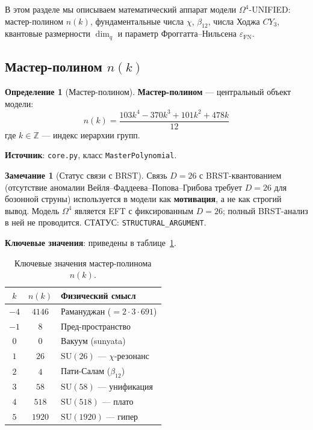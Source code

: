\documentclass[11pt,a4paper]{article}
\newcommand{\SU}{\ensuremath{\mathrm{SU}}}
\newcommand{\CY}{\ensuremath{CY_3}}
\newcommand{\Om}{\ensuremath{\Omega^4}}
\newcommand{\epsFN}{\ensuremath{\varepsilon_{\text{FN}}}}
\theoremstyle{definition}
\newtheorem{definition}[theorem]{Определение}
\newtheorem{remark}[theorem]{Замечание}
\begin{document}
В этом разделе мы описываем математический аппарат модели $\Om$-UNIFIED:
мастер-полином $n(k)$, фундаментальные числа $\chi$, $\beta_{12}$,
числа Ходжа $\CY$, квантовые размерности $\dim_q$ и параметр
Фроггатта--Нильсена $\epsFN$.

\subsection{Мастер-полином \texorpdfstring{$n(k)$}{n(k)}}
\label{subsec:master-poly}

\begin{definition}[Мастер-полином]
\label{def:master-poly}
\textbf{Мастер-полином} --- центральный объект модели:
\begin{equation}
    \boxed{
    n(k) = \frac{103 k^4 - 370 k^3 + 101 k^2 + 478 k}{12}
    }
    \label{eq:master-poly}
\end{equation}
где $k \in \mathbb{Z}$ --- индекс иерархии групп.
\end{definition}

\textbf{Источник}: \texttt{core.py}, класс \texttt{MasterPolynomial}.

\begin{remark}[Статус связи с BRST]
\label{rem:brst-status}
Связь $D = 26$ с BRST-квантованием
(отсутствие аномалии Вейля–Фаддеева–Попова–Грибова
требует $D = 26$ для бозонной струны)
используется в модели как \textbf{мотивация}, а не как
строгий вывод. Модель $\Om$ является EFT с фиксированным
$D = 26$; полный BRST-анализ в ней не проводится.
СТАТУС: \texttt{STRUCTURAL\_ARGUMENT}.
\end{remark}

\medskip\noindent
\textbf{Ключевые значения}: приведены в таблице~\ref{tab:master-poly-values}.

\begin{table}[ht]
\centering
\caption{Ключевые значения мастер-полинома \texorpdfstring{$n(k)$}{n(k)}.}
\label{tab:master-poly-values}
\begin{tabular}{ccl}
\toprule
$k$ & $n(k)$ & Физический смысл \\
\midrule
$-4$ & $4146$ & Рамануджан ($= 2 \cdot 3 \cdot 691$) \\
$-1$ & $8$ & Пред-пространство \\
$0$ & $0$ & Вакуум (sunyata) \\
$1$ & $26$ & $\SU(26)$ --- $\chi$-резонанс \\
$2$ & $4$ & Пати-Салам ($\beta_{12}$) \\
$3$ & $58$ & $\SU(58)$ --- унификация \\
$4$ & $518$ & $\SU(518)$ --- плато \\
$5$ & $1920$ & $\SU(1920)$ --- гипер \\
\bottomrule
\end{tabular}
\end{table}
\end{document}
